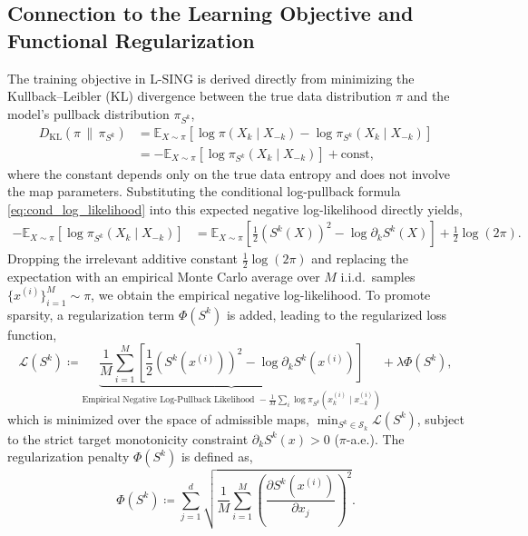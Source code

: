 \documentclass[11pt,a4paper]{article}
\theoremstyle{plain}
\theoremstyle{definition}
\theoremstyle{remark}
\begin{document}
\subsection{Connection to the Learning Objective and Functional Regularization}

The training objective in L-SING is derived directly from minimizing the Kullback--Leibler (KL) divergence between the true data distribution $\pi$ and the model's pullback distribution $\pi_{S^k}$,
\begin{align}
    D_{\mathrm{KL}}(\pi \,\|\, \pi_{S^k}) &= \mathbb{E}_{X \sim \pi}\left[ \log \pi(X_k \mid X_{-k}) - \log \pi_{S^k}(X_k \mid X_{-k}) \right] \\
    &= -\mathbb{E}_{X \sim \pi}\left[ \log \pi_{S^k}(X_k \mid X_{-k}) \right] + \mathrm{const},
\end{align}
where the constant depends only on the true data entropy and does not involve the map parameters. Substituting the conditional log-pullback formula \eqref{eq:cond_log_likelihood} into this expected negative log-likelihood directly yields,
\begin{align}
    -\mathbb{E}_{X \sim \pi}\left[ \log \pi_{S^k}(X_k \mid X_{-k}) \right] &= \mathbb{E}_{X \sim \pi}\left[ \frac{1}{2}(S^k(X))^2 - \log \partial_k S^k(X) \right] + \frac{1}{2}\log(2\pi).
\end{align}
Dropping the irrelevant additive constant $\frac{1}{2}\log(2\pi)$ and replacing the expectation with an empirical Monte Carlo average over $M$ i.i.d.\ samples $\{x^{(i)}\}_{i=1}^M \sim \pi$, we obtain the empirical negative log-likelihood. To promote sparsity, a regularization term $\Phi(S^k)$ is added, leading to the regularized loss function,
\begin{equation}
    \mathcal{L}(S^k) \coloneqq \underbrace{\frac{1}{M} \sum_{i=1}^M \left[ \frac{1}{2} (S^k(x^{(i)}))^2 - \log \partial_k S^k(x^{(i)}) \right]}_{\text{Empirical Negative Log-Pullback Likelihood } -\frac{1}{M}\sum_i \log \pi_{S^k}(x^{(i)}_k \mid x^{(i)}_{-k})} + \lambda \Phi(S^k),
    \label{eq:lsing_objective}
\end{equation}
which is minimized over the space of admissible maps, $\min_{S^k \in \mathcal{S}_k} \mathcal{L}(S^k)$, subject to the strict target monotonicity constraint $\partial_k S^k(x) > 0$ ($\pi$-a.e.). The regularization penalty $\Phi(S^k)$ is defined as,
\begin{equation}
    \Phi(S^k) \coloneqq \sum_{j=1}^d \sqrt{ \frac{1}{M} \sum_{i=1}^M \left( \frac{\partial S^k(x^{(i)})}{\partial x_j} \right)^2 }.
    \label{eq:rosasco_penalty}
\end{equation}
\end{document}
